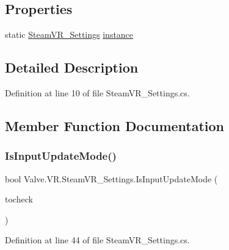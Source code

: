 \subsection*{Properties}
\begin{DoxyCompactItemize}
\item 
static \mbox{\hyperlink{class_valve_1_1_v_r_1_1_steam_v_r___settings}{Steam\+V\+R\+\_\+\+Settings}} \mbox{\hyperlink{class_valve_1_1_v_r_1_1_steam_v_r___settings_aba985fd967a79dc71cfc9078103f68b4}{instance}}
\end{DoxyCompactItemize}


\subsection{Detailed Description}


Definition at line 10 of file Steam\+V\+R\+\_\+\+Settings.\+cs.



\subsection{Member Function Documentation}
\mbox{\label{class_valve_1_1_v_r_1_1_steam_v_r___settings_abacc1d252c7c7a6999b84ffd368bbb73}} 
\subsubsection{\texorpdfstring{IsInputUpdateMode()}{IsInputUpdateMode()}}
{\footnotesize\ttfamily bool Valve.\+V\+R.\+Steam\+V\+R\+\_\+\+Settings.\+Is\+Input\+Update\+Mode (\begin{DoxyParamCaption}\item[{\mbox{\hyperlink{namespace_valve_1_1_v_r_ac8b0fe3bc9754b0fb9f1351ae3444ac6}{Steam\+V\+R\+\_\+\+Update\+Modes}}}]{tocheck }\end{DoxyParamCaption})}



Definition at line 44 of file Steam\+V\+R\+\_\+\+Settings.\+cs.

\mbox{\label{class_valve_1_1_v_r_1_1_steam_v_r___settings_a08a595b4924289a51e30bfe4e157c6e5}} 
